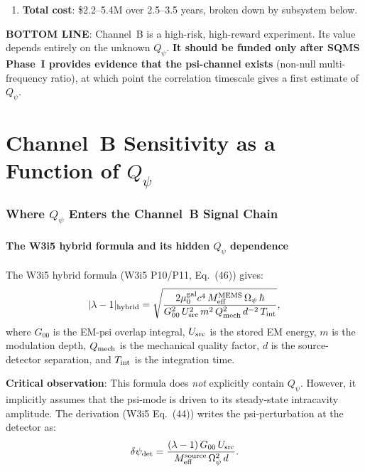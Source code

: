 \documentclass[11pt]{article}
\newcommand{\dpsi}{\delta\psi}
\newcommand{\lam}{\lambda}
\newcommand{\Opsi}{\Omega_\psi}
\newcommand{\Meff}{M_{\rm eff}}
\newcommand{\Qpsi}{Q_\psi}
\newcommand{\Qmech}{Q_{\rm mech}}
\newcommand{\muG}{\mu_0^{\rm gal}}
\newcommand{\lbone}{|\lam - 1|}
\theoremstyle{definition}
\theoremstyle{remark}
\begin{document}
\begin{tcolorbox}[colback=red!5!white, colframe=red!60!black,
  title=\textbf{W3i9 CHANNEL~B AUDIT --- CRITICAL FINDINGS}]
\begin{enumerate}[nosep]
\item \textbf{Total cost}: \$2.2--5.4M over 2.5--3.5 years,
  broken down by subsystem below.
\end{enumerate}

\textbf{BOTTOM LINE}: Channel~B is a high-risk, high-reward experiment.
Its value depends entirely on the unknown $\Qpsi$. \textbf{It should be
funded only after SQMS Phase~I provides evidence that the psi-channel
exists} (non-null multi-frequency ratio), at which point the correlation
timescale gives a first estimate of $\Qpsi$.
\end{tcolorbox}


\part{Channel~B Sensitivity as a Function of $\Qpsi$}
\label{part:Qpsi_sensitivity}

\section{Where $\Qpsi$ Enters the Channel~B Signal Chain}
\label{sec:Qpsi_enters}

\subsection{The W3i5 hybrid formula and its hidden $\Qpsi$ dependence}

The W3i5 hybrid formula (W3i5 P10/P11, Eq.~(46)) gives:
\begin{equation}
\lbone_{\rm hybrid} = \sqrt{
\frac{2\muG c^4\,\Meff^{\rm MEMS}\,\Opsi\,\hbar}
{G_{00}^2\,U_{\rm src}^2\,m^2\,\Qmech^2\,d^{-2}\,T_{\rm int}}
},
\label{eq:hybrid_original}
\end{equation}
where $G_{00}$ is the EM-psi overlap integral, $U_{\rm src}$ is the
stored EM energy, $m$ is the modulation depth, $\Qmech$ is the
mechanical quality factor, $d$ is the source-detector separation,
and $T_{\rm int}$ is the integration time.

\textbf{Critical observation}: This formula does \emph{not} explicitly
contain $\Qpsi$. However, it implicitly assumes that the psi-mode is
driven to its steady-state intracavity amplitude. The derivation
(W3i5 Eq.~(44)) writes the psi-perturbation at the detector as:
\begin{equation}
\dpsi_{\rm det} = \frac{(\lam-1)\,G_{00}\,U_{\rm src}}
{\Meff^{\rm source}\,\Opsi^2\,d}.
\label{eq:dpsi_det}
\end{equation}
\end{document}
